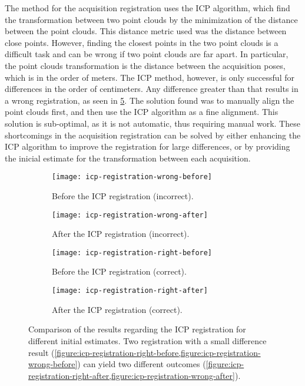 The method for the acquisition registration uses the ICP algorithm, which find the transformation between two point clouds by the minimization of the distance between the point clouds. This distance metric used was the distance between close points. However, finding the closest points in the two point clouds is a difficult task and can be wrong if two point clouds are far apart. In particular, the point clouds transformation is the distance between the acquisition poses, which is in the order of meters. The ICP method, however, is only successful for differences in the order of centimeters. Any difference greater than that results in a wrong registration, as seen in \cref{figure:icp-results}. The solution found was to manually align the point clouds first, and then use the ICP algorithm as a fine alignment. This solution is sub-optimal, as it is not automatic, thus requiring manual work. These shortcomings in the acquisition registration can be solved by either enhancing the ICP algorithm to improve the registration for large differences, or by providing the inicial estimate for the transformation between each acquisition.

\begin{figure}[h]
    
    \centering
    \begin{subfigure}[t]{0.5\textwidth}
        \texttt{[image: icp-registration-wrong-before]}
        \caption{Before the ICP registration (incorrect).}
        \label{figure:icp-registration-wrong-before}
    \end{subfigure}%
    \begin{subfigure}[t]{0.5\textwidth}
        \texttt{[image: icp-registration-wrong-after]}
        \caption{After the ICP registration (incorrect).}
        \label{figure:icp-registration-wrong-after}
    \end{subfigure}

    \begin{subfigure}[t]{0.5\textwidth}
        \texttt{[image: icp-registration-right-before]}
        \caption{Before the ICP registration (correct).}
        \label{figure:icp-registration-right-before}
    \end{subfigure}%
    \begin{subfigure}[t]{0.5\textwidth}
        \texttt{[image: icp-registration-right-after]}
        \caption{After the ICP registration (correct).}
        \label{figure:icp-registration-right-after}
    \end{subfigure}

    \caption{Comparison of the results regarding the ICP registration for different initial estimates. Two registration with a small difference result (\cref{figure:icp-registration-right-before,figure:icp-registration-wrong-before}) can yield two different outcomes (\cref{figure:icp-registration-right-after,figure:icp-registration-wrong-after}).}
    \label{figure:icp-results}

\end{figure}

